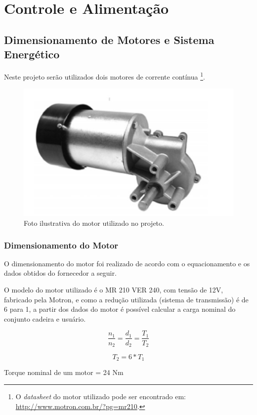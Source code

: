 \chapter{Controle e Alimentação}

\section{Dimensionamento de Motores e Sistema Energético}

Neste projeto serão utilizados dois motores de corrente contínua
\footnote{O \textit{datasheet} do motor utilizado pode ser encontrado em:
\url{http://www.motron.com.br/?pg=mr210}.}.

\begin{figure}[h!]
  \centering
  \includegraphics{figuras/Motor.jpg}
  \caption{Foto ilustrativa do motor utilizado no projeto.}
\end{figure}

\subsection{Dimensionamento do Motor}

O dimensionamento do motor foi realizado de acordo com o equacionamento e os dados obtidos do fornecedor a seguir.

O modelo do motor utilizado é o MR 210 VER 240, com tensão de 12V, fabricado
pela Motron, e como a redução utilizada (sistema de transmissão) é de 6 para 1,
a partir dos dados do motor é possível calcular a carga nominal do conjunto
cadeira e usuário.

\[\frac{n_1}{n_2} = \frac{d_1}{d_2} = \frac{T_1}{T_2}\]

\[T_2 = 6* T_1 \]

Torque nominal de um motor = 24 Nm

